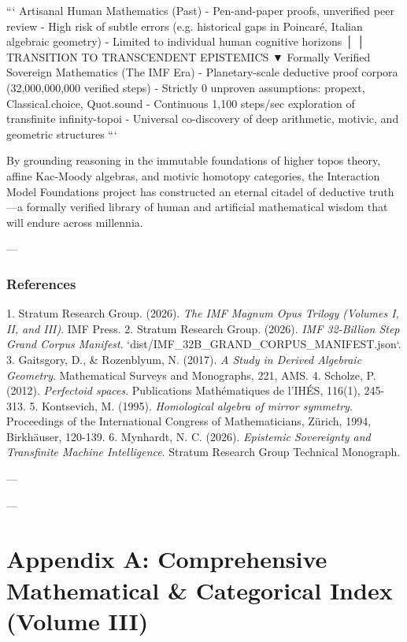\documentclass[11pt,twoside,openright]{amsbook}
\begin{document}
{```
  Artisanal Human Mathematics (Past)
  - Pen-and-paper proofs, unverified peer review
  - High risk of subtle errors (e.g. historical gaps in Poincaré, Italian algebraic geometry)
  - Limited to individual human cognitive horizons
                          │
                          │  TRANSITION TO TRANSCENDENT EPISTEMICS
                          ▼
  Formally Verified Sovereign Mathematics (The IMF Era)
  - Planetary-scale deductive proof corpora (32,000,000,000 verified steps)
  - Strictly 0 unproven assumptions: propext, Classical.choice, Quot.sound
  - Continuous 1,100 steps/sec exploration of transfinite infinity-topoi
  - Universal co-discovery of deep arithmetic, motivic, and geometric structures
```

By grounding reasoning in the immutable foundations of higher topos theory, affine Kac-Moody algebras, and motivic homotopy categories, the Interaction Model Foundations project has constructed an eternal citadel of deductive truth—a formally verified library of human and artificial mathematical wisdom that will endure across millennia.

---

\subsection{References}
1. Stratum Research Group. (2026). \textit{The IMF Magnum Opus Trilogy (Volumes I, II, and III)}. IMF Press.
2. Stratum Research Group. (2026). \textit{IMF 32-Billion Step Grand Corpus Manifest}. `dist/IMF_32B_GRAND_CORPUS_MANIFEST.json`.
3. Gaitsgory, D., & Rozenblyum, N. (2017). \textit{A Study in Derived Algebraic Geometry}. Mathematical Surveys and Monographs, 221, AMS.
4. Scholze, P. (2012). \textit{Perfectoid spaces}. Publications Mathématiques de l'IHÉS, 116(1), 245-313.
5. Kontsevich, M. (1995). \textit{Homological algebra of mirror symmetry}. Proceedings of the International Congress of Mathematicians, Zürich, 1994, Birkhäuser, 120-139.
6. Mynhardt, N. C. (2026). \textit{Epistemic Sovereignty and Transfinite Machine Intelligence}. Stratum Research Group Technical Monograph.


---



---

\chapter{Appendix A: Comprehensive Mathematical & Categorical Index (Volume III)}

}
\end{document}
